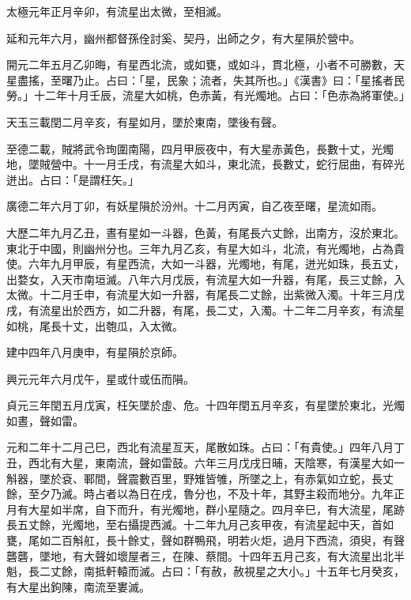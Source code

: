 \begin{pinyinscope}
 太極元年正月辛卯，有流星出太微，至相滅。



 延和元年六月，幽州都督孫佺討奚、契丹，出師之夕，有大星隕於營中。



 開元二年五月乙卯晦，有星西北流，或如甕，或如斗，貫北極，小者不可勝數，天星盡搖，至曙乃止。占曰：「星，民象；流者，失其所也。」《漢書》曰：「星搖者民勞。」十二年十月壬辰，流星大如桃，色赤黃，有光燭地。占曰：「色赤為將軍使。」



 天玉三載閏二月辛亥，有星如月，墜於東南，墜後有聲。



 至德二載，賊將武令珣圍南陽，四月甲辰夜中，有大星赤黃色，長數十丈，光燭地，墜賊營中。十一月壬戌，有流星大如斗，東北流，長數丈，蛇行屈曲，有碎光迸出。占曰：「是謂枉矢。」



 廣德二年六月丁卯，有妖星隕於汾州。十二月丙寅，自乙夜至曙，星流如雨。



 大歷二年九月乙丑，晝有星如一斗器，色黃，有尾長六丈餘，出南方，沒於東北。東北于中國，則幽州分也。三年九月乙亥，有星大如斗，北流，有光燭地，占為貴使。六年九月甲辰，有星西流，大如一斗器，光燭地，有尾，迸光如珠，長五丈，出婺女，入天市南垣滅。八年六月戊辰，有流星大如一升器，有尾，長三丈餘，入太微。十二月壬申，有流星大如一升器，有尾長二丈餘，出紫微入濁。十年三月戊戌，有流星出於西方，如二升器，有尾，長二丈，入濁。十二年二月辛亥，有流星如桃，尾長十丈，出匏瓜，入太微。



 建中四年八月庚申，有星隕於京師。



 興元元年六月戊午，星或什或伍而隕。



 貞元三年閏五月戊寅，枉矢墜於虛、危。十四年閏五月辛亥，有星墜於東北，光燭如晝，聲如雷。



 元和二年十二月己巳，西北有流星亙天，尾散如珠。占曰：「有貴使。」四年八月丁丑，西北有大星，東南流，聲如雷鼓。六年三月戊戌日晡，天陰寒，有漢星大如一斛器，墜於袞、鄆間，聲震數百里，野雉皆雊，所墜之上，有赤氣如立蛇，長丈餘，至夕乃滅。時占者以為日在戌，魯分也，不及十年，其野主殺而地分。九年正月有大星如半席，自下而升，有光燭地，群小星隨之。四月辛巳，有大流星，尾跡長五丈餘，光燭地，至右攝提西滅。十二年九月己亥甲夜，有流星起中天，首如甕，尾如二百斛舡，長十餘丈，聲如群鴨飛，明若火炬，過月下西流，須臾，有聲礱礱，墜地，有大聲如壞屋者三，在陳、蔡間。十四年五月己亥，有大流星出北半魁，長二丈餘，南抵軒轅而滅。占曰：「有赦，赦視星之大小。」十五年七月癸亥，有大星出鉤陳，南流至婁滅。




\end{pinyinscope}
